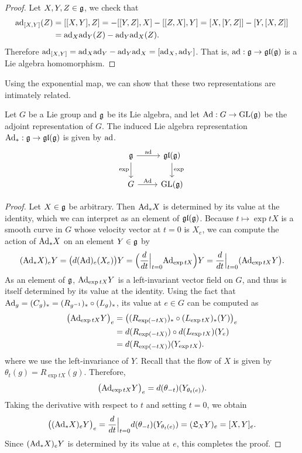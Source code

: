 \begin{proof}
Let $X,Y,Z\in\mathfrak{g}$, we check that
\begin{align*}
\mathrm{ad}_{[X,Y]}(Z)&=[[X,Y],Z]=-[[Y,Z],X]-[[Z,X],Y]=[X,[Y,Z]]-[Y,[X,Z]]\\
&=\mathrm{ad}_X\mathrm{ad}_Y(Z)-\mathrm{ad}_Y\mathrm{ad}_X(Z).
\end{align*}
Therefore $\mathrm{ad}_{[X,Y]}=\mathrm{ad}_X\mathrm{ad}_Y-\mathrm{ad}_Y\mathrm{ad}_X=[\mathrm{ad}_X,\mathrm{ad}_Y]$. That is, $\mathrm{ad}:\mathfrak{g}\to\mathfrak{gl}(\mathfrak{g})$ is a Lie algebra homomorphism.
\end{proof}
Using the exponential map, we can show that these two representations are intimately related.
\begin{theorem}\label{Lie ad repre}
Let $G$ be a Lie group and $\mathfrak{g}$ be its Lie algebra, and let $\mathrm{Ad}:G\to\mathrm{GL}(\mathfrak{g})$ be the adjoint representation of $G$. The induced Lie algebra representation $\mathrm{Ad}_*:\mathfrak{g}\to\mathfrak{gl}(\mathfrak{g})$ is given by $\mathrm{ad}$.
\[
\begin{tikzcd}
\g\ar[d,swap,"\exp"]\ar[r,"\ad"]&\gl(\g)\ar[d,"\exp"]\\
G\ar[r,"\Ad"]&\GL(\g)
\end{tikzcd}\]
\end{theorem}
\begin{proof}
Let $X\in\mathfrak{g}$ be arbitrary. Then $\mathrm{Ad}_*X$ is determined by its value at the identity, which we can interpret as an element of $\mathfrak{gl}(\mathfrak{g})$. Because $t\mapsto\exp tX$ is a smooth curve in $G$ whose velocity vector at $t=0$ is $X_e$, we can compute the action of $\mathrm{Ad}_*X$ on an element $Y\in\mathfrak{g}$ by
\[(\mathrm{Ad}_*X)_eY=\big(d(\mathrm{Ad})_e(X_e)\big)Y=\Big(\frac{d}{dt}\Big|_{t=0}\mathrm{Ad}_{\exp tX}\Big)Y=\frac{d}{dt}\Big|_{t=0}(\mathrm{Ad}_{\exp tX}Y\big).\]
As an element of $\mathfrak{g}$, $\mathrm{Ad}_{\exp tX}Y$ is a left-invariant vector field on $G$, and thus is itself determined by its value at the identity. Using the fact that $\mathrm{Ad}_g=(C_g)_*=(R_{g^{-1}})_*\circ(L_g)_*$, its value at $e\in G$ can be computed as
\begin{align*}
\big(\mathrm{Ad}_{\exp tX}Y\big)_e&=\big((R_{\exp(-tX)})_*\circ(L_{\exp tX})_*(Y)\big)_e\\
&=d(R_{\exp(-tX)})\circ d(L_{\exp tX})(Y_e)\\
&=d(R_{\exp(-tX)})(Y_{\exp tX}).
\end{align*}
where we use the left-invariance of $Y$. Recall that the flow of $X$ is given by $\theta_t(g)=R_{\exp tX}(g)$. Therefore, 
\[\big(\mathrm{Ad}_{\exp tX}Y\big)_e=d(\theta_{-t})(Y_{\theta_t(e)}).\]
Taking the derivative with respect to $t$ and setting $t=0$, we obtain
\[\big((\mathrm{Ad}_*X)_eY\big)_e=\frac{d}{dt}\Big|_{t=0}d(\theta_{-t})(Y_{\theta_t(e)})=(\mathfrak{L}_XY)_e=[X,Y]_e.\]
Since $(\mathrm{Ad}_*X)_eY$ is determined by its value at $e$, this completes the proof.
\end{proof}
